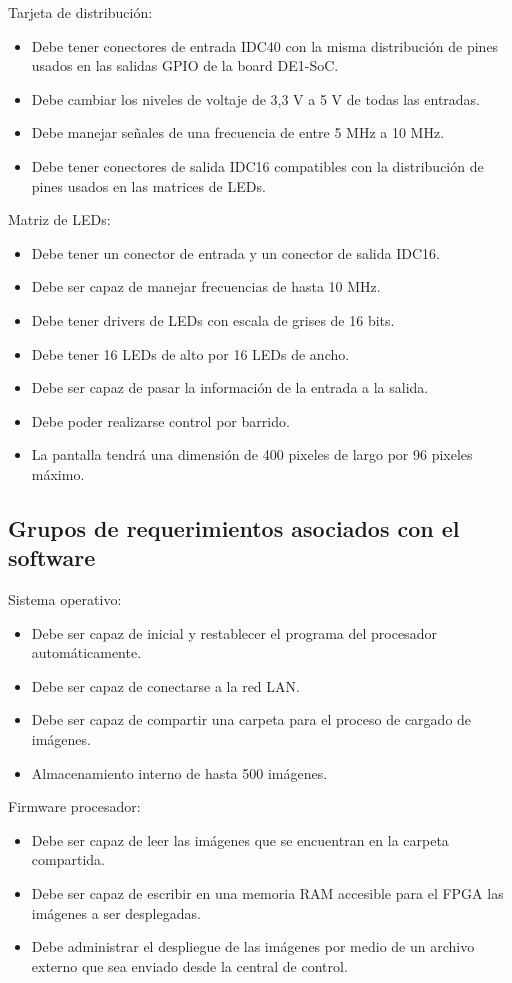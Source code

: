 Tarjeta de distribución:
\begin{itemize}
\item Debe tener conectores de entrada IDC40 con la misma distribución de pines usados en las salidas GPIO de la board DE1-SoC.
\item Debe cambiar los niveles de voltaje de 3,3 V a 5 V de todas las entradas. 
\item Debe manejar señales de una frecuencia de entre 5 MHz a 10 MHz.
\item Debe tener conectores de salida IDC16 compatibles con la distribución de pines usados en las matrices de LEDs.
\end{itemize}
Matriz de LEDs:
\begin{itemize}
\item Debe tener un conector de entrada y un conector de salida IDC16.
\item Debe ser capaz de manejar frecuencias de hasta 10 MHz.
\item Debe tener drivers de LEDs con escala de grises de 16 bits.
\item Debe tener 16 LEDs de alto por 16 LEDs de ancho.
\item Debe ser capaz de pasar la información de la entrada a la salida.
\item Debe poder realizarse control por barrido. 
\item La pantalla tendrá una dimensión de 400 pixeles de largo por 96 pixeles máximo.
\end{itemize}

\subsection{Grupos de requerimientos asociados con el software}

Sistema operativo:
\begin{itemize}
\item Debe ser capaz de inicial y restablecer el programa del procesador automáticamente.
\item Debe ser capaz de conectarse a la red LAN. 
\item Debe ser capaz de compartir una carpeta para el proceso de cargado de imágenes.
\item Almacenamiento interno de hasta 500 imágenes.
\end{itemize}

Firmware procesador:
\begin{itemize}
\item Debe ser capaz de leer las imágenes que se encuentran en la carpeta compartida.
\item Debe ser capaz de escribir en una  memoria RAM accesible para el FPGA  las imágenes a ser desplegadas.
\item Debe administrar el despliegue de las imágenes por medio de un archivo externo que sea enviado desde la central de control.
\end{itemize}
